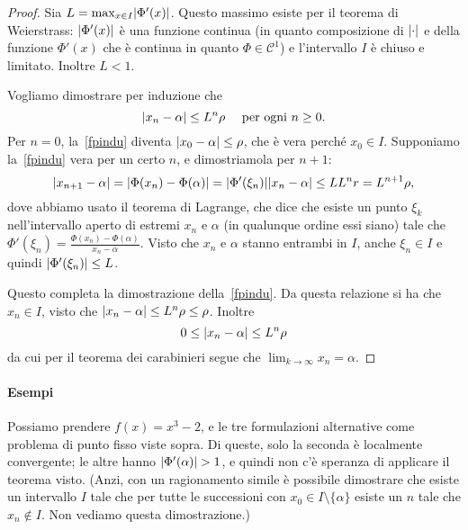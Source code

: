 \documentclass[a4paper]{report}
\DeclarePairedDelimiter{\abs}{\lvert}{\rvert}
\theoremstyle{definiton}
\theoremstyle{remark}
\begin{document}

\begin{proof}
Sia $L = \max_{x\in I} \abs{\Phi'(x)}$. Questo massimo esiste per il teorema di Weierstrass: $\abs{\Phi'(x)}$ è una funzione continua (in quanto composizione di $\abs{\cdot}$ e della funzione $\Phi'(x)$ che è continua in quanto $\Phi \in \mathcal{C}^1$) e l'intervallo $I$ è chiuso e limitato. Inoltre $L<1$.

Vogliamo dimostrare per induzione che 
\begin{equation} \label{fpindu}
    \abs{x_n - \alpha} \leq L^n \rho \quad \text{ per ogni $n \geq 0$}.    
\end{equation}
Per $n=0$, la~\eqref{fpindu} diventa $\abs{x_0 - \alpha} \leq \rho$, che è vera perché $x_0 \in I$. Supponiamo la~\eqref{fpindu} vera per un certo $n$, e dimostriamola per $n+1$:
\begin{equation} \label{fpindu2}
    \abs{x_{n+1} - \alpha} = \abs{\Phi(x_n) - \Phi(\alpha)} = \abs{\Phi'(\xi_n)} \abs{x_n - \alpha} \leq L L^n r = L^{n+1}\rho,    
\end{equation}
dove abbiamo usato il teorema di Lagrange, che dice che esiste un punto $\xi_k$ nell'intervallo aperto di estremi $x_n$ e $\alpha$ (in qualunque ordine essi siano) tale che $\Phi'(\xi_n) = \frac{\Phi(x_n) - \Phi(\alpha)}{x_n - \alpha}$. Visto che $x_n$ e $\alpha$ stanno entrambi in $I$, anche $\xi_n \in I$ e quindi $\abs{\Phi'(\xi_n)} \leq L$. 

Questo completa la dimostrazione della~\eqref{fpindu}. Da questa relazione si ha che $x_n \in I$, visto che $\abs{x_n - \alpha} \leq L^n \rho \leq \rho$. Inoltre
\[
0 \leq \abs{x_n - \alpha} \leq L^n \rho
\]
da cui per il teorema dei carabinieri segue che $\lim_{k\to \infty} x_n = \alpha$.
\end{proof}


\paragraph{Esempi} Possiamo prendere $f(x) = x^3 - 2$, e le tre formulazioni alternative come problema di punto fisso viste sopra. Di queste, solo la seconda è localmente convergente; le altre hanno $\abs{\Phi'(\alpha)} > 1$, e quindi non c'è speranza di applicare il teorema visto. (Anzi, con un ragionamento simile è possibile dimostrare che esiste un intervallo $I$ tale che per tutte le successioni con $x_0 \in I \setminus \{\alpha\}$ esiste un $n$ tale che $x_n \not\in I$. Non vediamo questa dimostrazione.)
\end{document}
